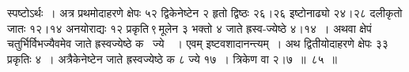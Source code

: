 \documentclass[11pt, openany]{book}
\begin{document}
\begin{sloppypar}
स्पष्टोऽर्थः~। अत्र प्रथमोदाहरणे क्षेपः ५२ द्विकेनेष्टेन २ हृतो द्विष्ठः २६।२६ इष्टोनाढ्यो २४।२८ दलीकृतो जातः १२।१४ अनयोराद्यः १२ प्रकृति\textendash \,९\textendash \,मूलेन ३ भक्तो ४ जाते ह्रस्व-ज्येष्ठे ४।१४~। अथवा क्षेपं चतुर्भिर्विभज्यैवमेव जाते ह्रस्वज्येष्ठे क \, ज्ये \,~। एवम् इष्टवशादानन्त्यम्~। अथ द्वितीयोदाहरणे क्षेपः ३३ प्रकृतिः ४~। अत्रैकेनेष्टेन जाते ह्रस्वज्येष्ठे क ८ ज्ये १७~। त्रिकेण वा २।७~॥~८५~॥
\end{sloppypar}

\newpage
\end{document}
